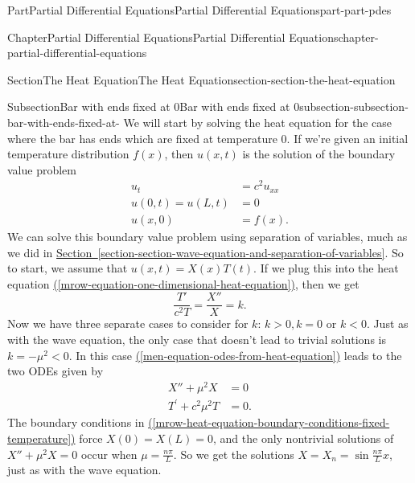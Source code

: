 \documentclass[twoside,10pt,]{book}
\newcommand{\xreffont}{\relax}
\numberwithin{equation}{part}
\newcommand{\lt}{<}
\newcommand{\gt}{>}
\newcommand{\amp}{&}
\begin{document}
\begin{partptx}{Part}{Partial Differential Equations}{}{Partial Differential Equations}{}{}{part-part-pdes}
\begin{chapterptx}{Chapter}{Partial Differential Equations}{}{Partial Differential Equations}{}{}{chapter-partial-differential-equations}
\begin{sectionptx}{Section}{The Heat Equation}{}{The Heat Equation}{}{}{section-section-the-heat-equation}
%
\typeout{************************************************}
\typeout{************************************************}
%
\begin{subsectionptx}{Subsection}{Bar with ends fixed at \(0\)}{}{Bar with ends fixed at \(0\)}{}{}{subsection-subsection-bar-with-ends-fixed-at-}
We will start by solving the heat equation for the case where the bar has ends which are fixed at temperature \(0\). If we're given an initial temperature distribution \(f(x)\), then \(u(x,t)\) is the solution of the boundary value problem%
%
\begin{align}
u_{t} \amp = c^{2}u_{xx} \label{mrow-equation-one-dimensional-heat-equation}\\
u(0,t) = u(L,t) \amp = 0 \label{mrow-heat-equation-boundary-conditions-fixed-temperature}\\
u(x,0) \amp = f(x) \text{.}\label{mrow-heat-equation-initial-condition}
\end{align}
We can solve this boundary value problem using separation of variables, much as we did in \hyperref[section-section-wave-equation-and-separation-of-variables]{Section~{\xreffont\ref{section-section-wave-equation-and-separation-of-variables}}}. So to start, we assume that \(u(x,t) = X(x)T(t)\). If we plug this into the heat equation \hyperref[mrow-equation-one-dimensional-heat-equation]{({\xreffont\ref{mrow-equation-one-dimensional-heat-equation}})}, then we get%
%
\begin{equation}
\frac{T'}{c^{2}T} = \frac{X''}{X} = k.\label{men-equation-odes-from-heat-equation}
\end{equation}
Now we have three separate cases to consider for \(k\): \(k\gt0, k=0\) or \(k\lt0\). Just as with the wave equation, the only case that doesn't lead to trivial solutions is \(k=-\mu^{2}\lt0\). In this case \hyperref[men-equation-odes-from-heat-equation]{({\xreffont\ref{men-equation-odes-from-heat-equation}})} leads to the two ODEs given by%
%
\begin{align*}
X''+\mu^{2}X \amp = 0 \\
T^{\prime}+c^{2}\mu^{2}T \amp = 0 \text{.}
\end{align*}
The boundary conditions in \hyperref[mrow-heat-equation-boundary-conditions-fixed-temperature]{({\xreffont\ref{mrow-heat-equation-boundary-conditions-fixed-temperature}})} force \(X(0) = X(L) = 0\), and the only nontrivial solutions of \(X''+\mu^{2}X = 0\) occur when \(\mu = \frac{n\pi}{L}\). So we get the solutions \(X = X_{n} = \sin\frac{n\pi}{L}x\), just as with the wave equation.%

\end{subsectionptx}
\end{sectionptx}
\end{chapterptx}
\end{partptx}
\end{document}

